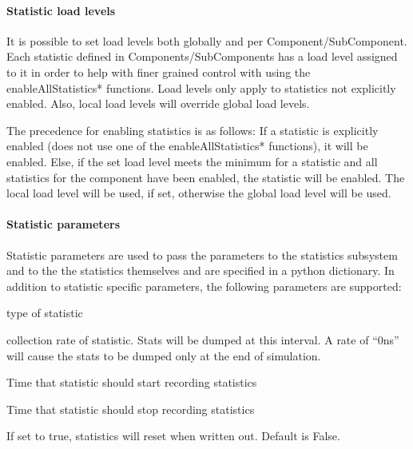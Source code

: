 \paragraph{Statistic load levels}
It is possible to set load levels both globally and per
Component/SubComponent.  Each statistic defined in
Components/SubComponents has a load level assigned to it in order to
help with finer grained control with using the enableAllStatistics*
functions.  Load levels only apply to statistics not explicitly
enabled.  Also, local load levels will override global load levels.

The precedence for enabling statistics is as follows: If a statistic
is explicitly enabled (does not use one of the enableAllStatistics*
functions), it will be enabled.  Else, if the set load level meets the
minimum for a statistic and all statistics for the component have been
enabled, the statistic will be enabled.  The local load level will be
used, if set, otherwise the global load level will be used.

\paragraph{Statistic parameters}
Statistic parameters are used to pass the parameters to the statistics
subsystem and to the the statistics themselves and are specified in a
python dictionary.  In addition to statistic specific parameters, the
following parameters are supported:

\begin{description}
  \setlength{\listparindent}{\parindent}%
  \setlength{\itemindent}{\parindent}%
  \setlength{\parsep}{\parskip}%
   type of statistic
    
   collection rate of statistic.  Stats will be dumped at
  this interval.  A rate of “0ns” will cause the stats to be dumped
  only at the end of simulation.

   Time that statistic should start recording
  statistics

   Time that statistic should stop recording statistics
             
   If set to true, statistics will reset when
  written out.  Default is False.
\end{description}

